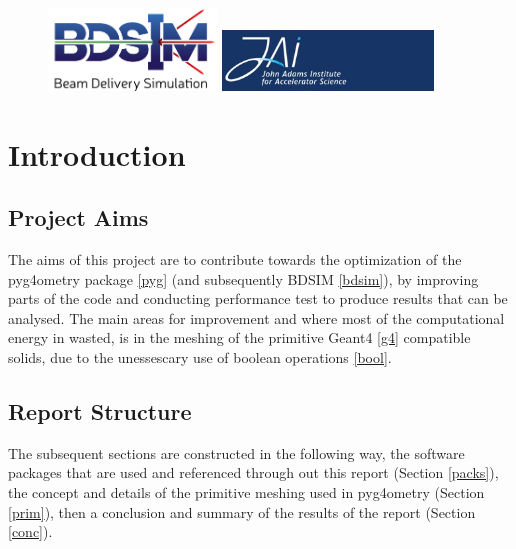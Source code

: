 \documentclass[12pt,a4paper]{article}
\begin{document}
\begin{titlepage}
\begin{figure}[h]
\centering
\begin{minipage}{.6\textwidth}
  \includegraphics[width=0.4\textwidth]{Images//Logos//BDSIM_Logo.jpg}
\end{minipage}%
\begin{minipage}{.6\textwidth}
  \centering
  \includegraphics[width=0.5\textwidth]{Images//Logos//JAI_Logo.jpeg}
  \end{minipage}
\end{figure}

\end{titlepage}
\leavevmode\thispagestyle{empty}\newpage
\tableofcontents
\thispagestyle{empty}
\newpage
\onecolumn

\small
\setcounter{page}{1}


\section{Introduction}

\subsection{Project Aims}
The aims of this project are to contribute towards the optimization of the pyg4ometry package \ref{pyg} (and subsequently BDSIM \ref{bdsim}), by improving parts of the code and conducting performance test to produce results that can be analysed. The main areas for improvement and where most of the computational energy in wasted, is in the meshing of the primitive Geant4 \ref{g4} compatible solids, due to the unessescary use of boolean operations \ref{bool}.

\subsection{Report Structure}
The subsequent sections are constructed in the following way, the software packages that are used and referenced through out this report (Section \ref{packs}), the concept and details of the primitive meshing used in pyg4ometry (Section \ref{prim}), then a conclusion and summary of the results of the report (Section \ref{conc}).
\end{document}
